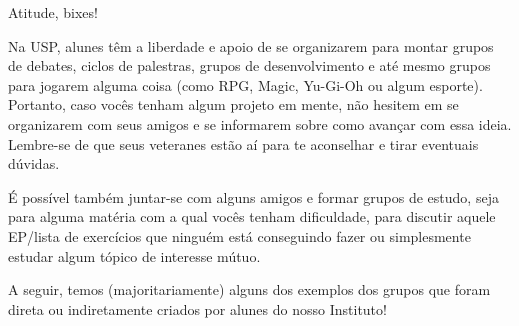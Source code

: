 
\begin{secao}{Atitude, bixes!}

Na USP, alunes têm a liberdade e apoio de se organizarem
para montar grupos de debates, ciclos de palestras, grupos
de desenvolvimento e até mesmo grupos para jogarem alguma coisa (como
RPG, Magic, Yu-Gi-Oh ou algum esporte).
Portanto, caso vocês tenham algum projeto em mente, não hesitem
em se organizarem com seus amigos e se informarem sobre como avançar com essa
ideia. Lembre-se de que seus veteranes estão aí para te aconselhar e tirar
eventuais dúvidas.

É possível também juntar-se com alguns amigos e formar grupos de
estudo, seja para alguma matéria com a qual vocês tenham dificuldade, para
discutir aquele EP/lista de exercícios que ninguém está conseguindo
fazer ou simplesmente estudar algum tópico de interesse mútuo.

A seguir, temos (majoritariamente) alguns dos exemplos dos grupos que foram 
direta ou indiretamente criados por alunes do nosso Instituto!
























\end{secao}
